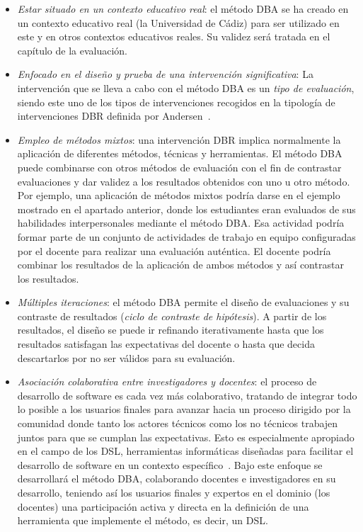 \begin{itemize}
\item \emph{Estar situado en un contexto educativo real}: el método DBA se ha creado en un contexto educativo real (la Universidad de Cádiz) para ser utilizado en este y en otros contextos educativos reales. Su validez será tratada en el capítulo de la evaluación.
\item \emph{Enfocado en el diseño y prueba de una intervención significativa}: La intervención que se lleva a cabo con el método DBA es un \emph{tipo de evaluación}, siendo este uno de los tipos de intervenciones recogidos en la tipología de intervenciones DBR definida por Andersen~\cite{anderson2012design}. 
\item \emph{Empleo de métodos mixtos}: una intervención DBR implica normalmente la aplicación de diferentes métodos, técnicas y herramientas. El método DBA puede combinarse con otros métodos de evaluación con el fin de contrastar evaluaciones y dar validez a los resultados obtenidos con uno u otro método. Por ejemplo, una aplicación de métodos mixtos podría darse en el ejemplo mostrado en el apartado anterior, donde los estudiantes eran evaluados de sus habilidades interpersonales mediante el método DBA. Esa actividad podría formar parte de un conjunto de actividades de trabajo en equipo configuradas por el docente para realizar una evaluación auténtica. El docente podría combinar los resultados de la aplicación de ambos métodos y así contrastar los resultados.
\item \emph{Múltiples iteraciones}: el método DBA permite el diseño de evaluaciones y su contraste de resultados (\emph{ciclo de contraste de hipótesis}). A partir de los resultados, el diseño se puede ir refinando iterativamente hasta que los resultados satisfagan las expectativas del docente o hasta que decida descartarlos por no ser válidos para su evaluación.
\item \emph{Asociación colaborativa entre investigadores y docentes}: el proceso de desarrollo de software es cada vez más colaborativo, tratando de integrar todo lo posible a los usuarios finales para avanzar hacia un proceso dirigido por la comunidad donde tanto los actores técnicos como los no técnicos trabajen juntos para que se cumplan las expectativas. Esto es especialmente apropiado en el campo de los DSL, herramientas informáticas diseñadas para facilitar el desarrollo de software en un contexto específico~\cite{izquierdo2012community}. Bajo este enfoque se desarrollará el método DBA, colaborando docentes e investigadores en su desarrollo, teniendo así los usuarios finales y expertos en el dominio (los docentes) una participación activa y directa en la definición de una herramienta que implemente el método, es decir, un DSL. 

\end{itemize}
